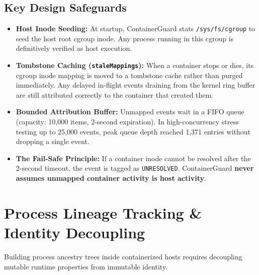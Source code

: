\documentclass[11pt,a4paper]{article}
\begin{document}
\subsection{Key Design Safeguards}
\begin{itemize}
    \item \textbf{Host Inode Seeding:} At startup, ContainerGuard stats \texttt{/sys/fs/cgroup} to seed the host root cgroup inode. Any process running in this cgroup is definitively verified as host execution.
    \item \textbf{Tombstone Caching (\texttt{staleMappings}):} When a container stops or dies, its cgroup inode mapping is moved to a tombstone cache rather than purged immediately. Any delayed in-flight events draining from the kernel ring buffer are still attributed correctly to the container that created them.
    \item \textbf{Bounded Attribution Buffer:} Unmapped events wait in a FIFO queue (capacity: 10,000 items, 2-second expiration). In high-concurrency stress testing up to 25,000 events, peak queue depth reached 1,371 entries without dropping a single event.
    \item \textbf{The Fail-Safe Principle:} If a container inode cannot be resolved after the 2-second timeout, the event is tagged as \texttt{UNRESOLVED}. ContainerGuard \textbf{never assumes unmapped container activity is host activity}.
\end{itemize}

\newpage


\section{Process Lineage Tracking \& Identity Decoupling}

Building process ancestry trees inside containerized hosts requires decoupling mutable runtime properties from immutable identity.
\end{document}

